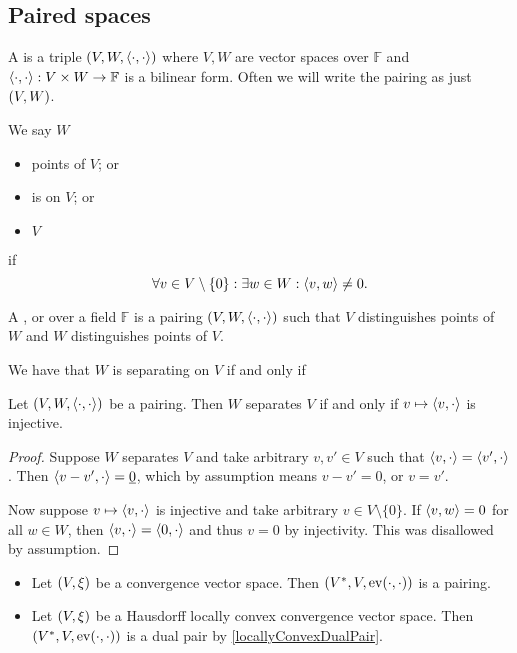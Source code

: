 \subsection{Paired spaces}
\begin{definition}
A  is a triple $\left( V,W, \left\langle \cdot,\cdot \right\rangle \right)$ where $V,W$ are vector spaces over $\mathbb{F}$ and $\left\langle \cdot,\cdot \right\rangle: V\times W\to \mathbb{F}$ is a bilinear form. Often we will write the pairing as just $\left( V,W \right)$.

We say $W$
\begin{itemize}
\item {} points of $V$; or
\item is  on $V$; or
\item {} $V$
\end{itemize}
if 
\[ \forall v\in V\setminus\{0\}: \exists w\in W: \left\langle v,w \right\rangle \neq 0. \]

A ,  or  over a field $\mathbb{F}$ is a pairing $\left( V,W,\left\langle \cdot,\cdot \right\rangle \right)$ such that $V$ distinguishes points of $W$ and $W$ distinguishes points of $V$.
\end{definition}
We have that $W$ is separating on $V$ \textup{if and only if}

\begin{lemma} \label{dualSystemInjective}
Let $\left( V,W, \left\langle \cdot,\cdot \right\rangle \right)$ be a pairing. Then $W$ separates $V$ \textup{if and only if} $v\mapsto \left\langle v, \cdot \right\rangle$ is injective.
\end{lemma}
\begin{proof}
Suppose $W$ separates $V$ and take arbitrary $v,v'\in V$ such that $\left\langle v, \cdot \right\rangle = \left\langle v', \cdot \right\rangle$. Then $\left\langle v-v',\cdot \right\rangle = \underline{0}$, which by assumption means $v-v' = 0$, or $v= v'$.

Now suppose $v\mapsto \left\langle v, \cdot \right\rangle$ is injective and take arbitrary $v\in V\setminus\{0\}$. If $\left\langle v,w \right\rangle = 0$ for all $w\in W$, then $\left\langle v,\cdot \right\rangle = \left\langle 0,\cdot \right\rangle$ and thus $v=0$ by injectivity. This was disallowed by assumption.
\end{proof}

\begin{example}
\begin{itemize}
\item Let $\left( V, \xi \right)$ be a convergence vector space. Then $\left( {V}^*, V, \operatorname{ev}(\cdot,\cdot) \right)$ is a pairing.
\item Let $\left( V,\xi \right)$ be a Hausdorff locally convex convergence vector space. Then $\left( {V}^*, V, \operatorname{ev}(\cdot,\cdot) \right)$ is a dual pair by \ref{locallyConvexDualPair}.
\end{itemize}
\end{example}


